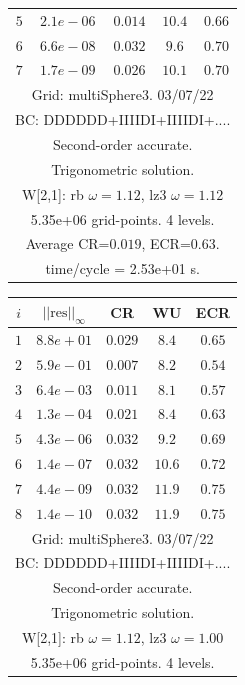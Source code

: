 \begin{table}[hbt]
\begin{center}
{\begin{tabular}{|c|c|c|c|c|}
 $ 5$  & $ 2.1e-06$ & $0.014$ & $10.4$ & $0.66$ \\ 
 $ 6$  & $ 6.6e-08$ & $0.032$ & $ 9.6$ & $0.70$ \\ 
 $ 7$  & $ 1.7e-09$ & $0.026$ & $10.1$ & $0.70$ \\ 
\hline 
\multicolumn{5}{|c|}{Grid: multiSphere3. 03/07/22}  \\
\multicolumn{5}{|c|}{BC: DDDDDD+IIIIDI+IIIIDI+....}  \\
\multicolumn{5}{|c|}{Second-order accurate.}  \\
\multicolumn{5}{|c|}{Trigonometric solution.}  \\
\multicolumn{5}{|c|}{W[2,1]: rb $\omega=1.12$, lz3 $\omega=1.12$}  \\
\multicolumn{5}{|c|}{5.35e+06 grid-points. 4 levels.}  \\
\multicolumn{5}{|c|}{Average CR=$0.019$, ECR=$0.63$.}  \\
\multicolumn{5}{|c|}{time/cycle = 2.53e+01 s.}  \\
\hline 
\end{tabular}
\begin{tabular}{|c|c|c|c|c|} \hline 
 $i$   & $\vert\vert\mbox{res}\vert\vert_\infty$  &  CR     &  WU    & ECR  \\   \hline 
 $ 1$  & $ 8.8e+01$ & $0.029$ & $ 8.4$ & $0.65$ \\ 
 $ 2$  & $ 5.9e-01$ & $0.007$ & $ 8.2$ & $0.54$ \\ 
 $ 3$  & $ 6.4e-03$ & $0.011$ & $ 8.1$ & $0.57$ \\ 
 $ 4$  & $ 1.3e-04$ & $0.021$ & $ 8.4$ & $0.63$ \\ 
 $ 5$  & $ 4.3e-06$ & $0.032$ & $ 9.2$ & $0.69$ \\ 
 $ 6$  & $ 1.4e-07$ & $0.032$ & $10.6$ & $0.72$ \\ 
 $ 7$  & $ 4.4e-09$ & $0.032$ & $11.9$ & $0.75$ \\ 
 $ 8$  & $ 1.4e-10$ & $0.032$ & $11.9$ & $0.75$ \\ 
\hline 
\multicolumn{5}{|c|}{Grid: multiSphere3. 03/07/22}  \\
\multicolumn{5}{|c|}{BC: DDDDDD+IIIIDI+IIIIDI+....}  \\
\multicolumn{5}{|c|}{Second-order accurate.}  \\
\multicolumn{5}{|c|}{Trigonometric solution.}  \\
\multicolumn{5}{|c|}{W[2,1]: rb $\omega=1.12$, lz3 $\omega=1.00$}  \\
\multicolumn{5}{|c|}{5.35e+06 grid-points. 4 levels.}  \\

\end{tabular}}
\end{center}
\end{table}
